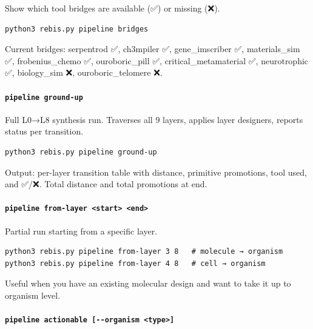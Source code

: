 \documentclass[12pt,a4paper]{article}
\begin{document}
Show which tool bridges are available (✅) or missing (❌).

\begin{verbatim}
python3 rebis.py pipeline bridges
\end{verbatim}

Current bridges: serpentrod ✅, ch3mpiler ✅, gene\_imscriber ✅,
materials\_sim ✅, frobenius\_chemo ✅, ouroboric\_pill ✅,
critical\_metamaterial ✅, neurotrophic ✅, biology\_sim ❌,
ouroboric\_telomere ❌.

\hypertarget{pipeline-ground-up}{%
\paragraph{\texorpdfstring{\texttt{pipeline\ ground-up}}{pipeline ground-up}}\label{pipeline-ground-up}}

Full L0→L8 synthesis run. Traverses all 9 layers, applies layer
designers, reports status per transition.

\begin{verbatim}
python3 rebis.py pipeline ground-up
\end{verbatim}

Output: per-layer transition table with distance, primitive promotions,
tool used, and ✅/❌. Total distance and total promotions at end.

\hypertarget{pipeline-from-layer-start-end}{%
\paragraph{\texorpdfstring{\texttt{pipeline\ from-layer\ \textless{}start\textgreater{}\ \textless{}end\textgreater{}}}{pipeline from-layer \textless start\textgreater{} \textless end\textgreater{}}}\label{pipeline-from-layer-start-end}}

Partial run starting from a specific layer.

\begin{verbatim}
python3 rebis.py pipeline from-layer 3 8   # molecule → organism
python3 rebis.py pipeline from-layer 4 8   # cell → organism
\end{verbatim}

Useful when you have an existing molecular design and want to take it up
to organism level.

\hypertarget{pipeline-actionable---organism-type}{%
\paragraph{\texorpdfstring{\texttt{pipeline\ actionable\ {[}-\/-organism\ \textless{}type\textgreater{}{]}}}{pipeline actionable {[}-\/-organism \textless type\textgreater{]}}}\label{pipeline-actionable---organism-type}}
\end{document}
